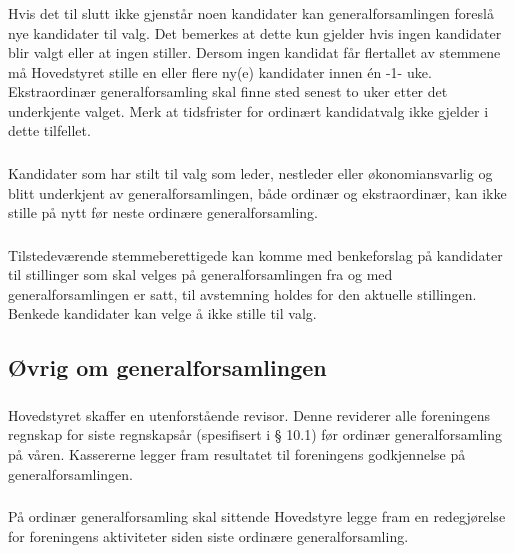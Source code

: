 \subsubsection{}
Hvis det til slutt ikke gjenstår noen kandidater kan generalforsamlingen
foreslå nye kandidater til valg. Det bemerkes at dette kun gjelder hvis ingen
kandidater blir valgt eller at ingen stiller. Dersom ingen
kandidat får flertallet av stemmene må Hovedstyret stille en eller flere ny(e)
kandidater innen én -1- uke. Ekstraordinær generalforsamling skal finne sted
senest to uker etter det underkjente valget. Merk at tidsfrister for ordinært
kandidatvalg ikke gjelder i dette tilfellet.

\subsubsection{}
Kandidater som har stilt til valg som leder, nestleder eller økonomiansvarlig
og blitt underkjent av generalforsamlingen, både ordinær og ekstraordinær, kan
ikke stille på nytt før neste ordinære generalforsamling.

\subsubsection{}
Tilstedeværende stemmeberettigede kan komme med benkeforslag på kandidater til
stillinger som skal velges på generalforsamlingen fra og med
generalforsamlingen er satt, til avstemning holdes for den aktuelle stillingen.
Benkede kandidater kan velge å ikke stille til valg.

\subsection{Øvrig om generalforsamlingen}
\subsubsection{}
Hovedstyret skaffer en utenforstående revisor. Denne reviderer alle foreningens
regnskap for siste regnskapsår (spesifisert i § 10.1) før ordinær
generalforsamling på våren.  Kassererne legger fram resultatet til foreningens
godkjennelse på generalforsamlingen.

\subsubsection{}
På ordinær generalforsamling skal sittende Hovedstyre legge fram en
redegjørelse for foreningens aktiviteter siden siste ordinære
generalforsamling.

